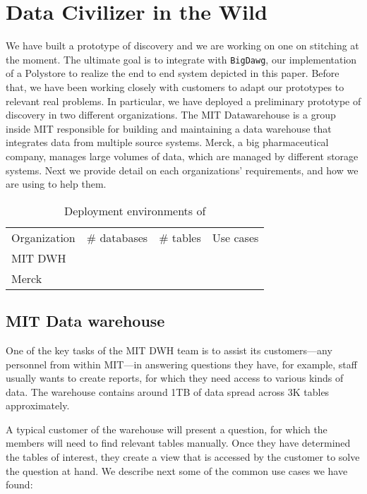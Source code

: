 \section{Data Civilizer in the Wild}
\label{sec:wild}

We have built a prototype of discovery and we are working on one on stitching at the moment. The ultimate goal is to integrate \dcv with \texttt{BigDawg}, our implementation of a Polystore to realize the end to end system depicted in this paper. Before that, we have been working closely with customers to adapt our prototypes to relevant real problems. In particular, we have deployed a preliminary prototype of discovery in two different organizations. The MIT Datawarehouse is a group inside MIT responsible for building and maintaining a data warehouse that integrates data from multiple source systems. Merck, a big pharmaceutical company, manages large volumes of data, which are managed by different storage systems. Next we provide detail on each organizations’ requirements, and how we are using \dcv to help them.


\begin{table}
\caption{Deployment environments of \dcv{}}\label{tab:dataCivInTheWild}
\begin{tabular}{|l|l|l|l|}
\hline
Organization & \# databases & \# tables & Use cases\\
MIT DWH & & & \\
Merck & & & \\
\hline
\end{tabular}
\end{table}


\subsection{MIT Data warehouse}


One of the key tasks of the MIT DWH team is to assist its customers—any personnel from within MIT—in answering questions they have, for example, staff usually wants to create reports, for which they need access to various kinds of data. The warehouse contains around 1TB of data spread across 3K tables approximately.

A typical customer of the warehouse will present a question, for which the members will need to find relevant tables manually. Once they have determined the tables of interest, they create a view that is accessed by the customer to solve the question at hand. We describe next some of the common use cases we have found:

